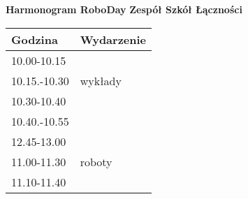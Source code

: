 \documentclass{article}
\begin{document}
\begin{center}
\Large\textbf{Harmonogram RoboDay}
\large\textbf{Zespół Szkół Łączności}
\end{center}
\vspace{1cm}
\begin{center}
\begin{tabular}{|l|l|}
\hline
\textbf{Godzina} & \textbf{Wydarzenie} \\
\hline
10.00-10.15 &  \\
\hline
10.15.-10.30 & wykłady \\
\hline
10.30-10.40 &  \\
\hline
10.40.-10.55 &  \\
\hline
12.45-13.00 &  \\
\hline
11.00-11.30 & roboty \\
\hline
11.10-11.40 &  \\
\hline
\end{tabular}
\end{center}
\end{document}
